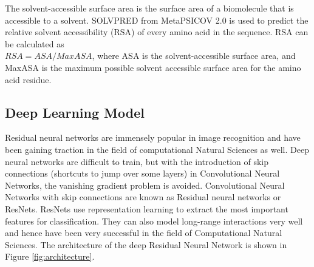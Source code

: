 \documentclass[journal=jacsat,manuscript=article]{achemso}
\begin{document}
The solvent-accessible surface area is the surface area of a biomolecule that is accessible to a solvent. SOLVPRED from MetaPSICOV 2.0\cite{jones2015metapsicov} is used to predict the relative solvent accessibility (RSA) of every amino acid in the sequence. RSA can be calculated as \\ ${RSA} = {ASA} / {MaxASA}$, where ASA is the solvent-accessible surface area, and MaxASA is the maximum possible solvent accessible surface area for the amino acid residue.





\subsection{Deep Learning Model}
\quad Residual neural networks \cite{he2016deep} are immensely popular in image recognition and have been gaining traction in the field of computational Natural Sciences as well. Deep neural networks are difficult to train, but with the introduction of skip connections (shortcuts to jump over some layers) in Convolutional Neural Networks, the vanishing gradient problem is avoided. Convolutional Neural Networks with skip connections are known as Residual neural networks or ResNets. ResNets use representation learning to extract the most important features for classification. They can also model long-range interactions very well and hence have been very successful in the field of Computational Natural Sciences.  The architecture of the deep Residual Neural Network is shown in Figure \ref{fig:architecture}.
\end{document}
